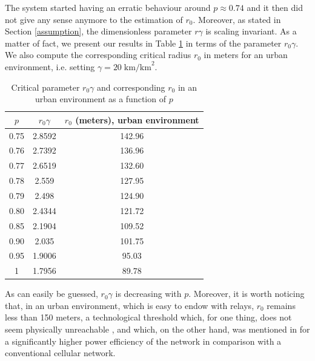 \documentclass[conference]{IEEEtran}
\begin{document}
\indent The system started having an erratic behaviour around $p \approx 0.74$ and it then did not give any sense anymore to the estimation of $r_{0}$. Moreover, as stated in Section \ref{assumption}, the dimensionless parameter $r\gamma$ is scaling invariant. As a matter of fact, we present our results in Table \ref{tab-rgamma0} in terms of the parameter $r_{0}\gamma$. We also compute the corresponding critical radius $r_{0}$ in meters for an urban environment, i.e. setting $\gamma = 20 \; \text{km/km}^{2}$.
\begin{table}[t!]
\caption{Critical parameter $r_{0}\gamma$ and corresponding $r_{0}$ in an urban environment as a function of $p$}
\begin{center}
\begin{tabular}{|c|c|c|}
\hline
$p$ & $r_{0}\gamma$ & $r_{0}$ (meters), urban environment \\
\hline
0.75 & 2.8592 & 142.96  \\
0.76 & 2.7392 & 136.96 \\
0.77 & 2.6519 & 132.60 \\
0.78 & 2.559 & 127.95  \\
0.79 & 2.498 & 124.90 \\
0.80 & 2.4344 & 121.72  \\
0.85 & 2.1904 & 109.52 \\
0.90 & 2.035 & 101.75 \\
0.95 & 1.9006  & 95.03 \\
1 & 1.7956 & 89.78  \\
\hline
\end{tabular}
\label{tab-rgamma0}
\end{center}
\end{table}
\newline \indent As can easily be guessed, $r_{0}\gamma$ is decreasing with $p$. Moreover, it is worth noticing that, in an urban environment, which is easy to endow with relays, $r_{0}$ remains less than 150 meters, a technological threshold which, for one thing, does not seem physically unreachable \cite{lin_comprehensive_2013}, and which, on the other hand, was mentioned in \cite{asadi_survey_2014} for a significantly higher power efficiency of the network in comparison with a conventional cellular network. \\
\end{document}
